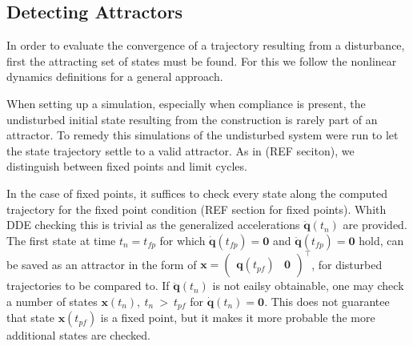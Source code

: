







\subsection{Detecting Attractors}

In order to evaluate the convergence of a trajectory resulting from a disturbance, first the attracting set of states must be found. For this we follow the nonlinear dynamics definitions for a general approach.


When setting up a simulation, especially when compliance is present, the undisturbed initial state resulting from the construction is rarely part of an attractor. To remedy this simulations of the undisturbed system were run to let the state trajectory settle to a valid attractor. As in (REF seciton), we distinguish between fixed points and limit cycles. 

In the case of fixed points, it suffices to check every state along the computed trajectory for the fixed point condition (REF section for fixed points). Whith DDE checking this is trivial as the generalized accelerations $\ddot{\mathbf{q}}(t_n)$ are provided. 
The first state at time $t_n = t_{fp}$ for which $\dot{\mathbf{q}}(t_{fp}) = \mathbf{0}$ and $\ddot{\mathbf{q}}(t_{fp}) = \mathbf{0}$ hold, can be saved as an attractor in the form of $\mathbf{x} = \begin{pmatrix}\mathbf{q}(t_{pf})&\mathbf{0}\end{pmatrix}^\intercal$, for disturbed trajectories to be compared to. 
If $\ddot{\mathbf{q}}(t_n)$ is not eailsy obtainable, one may check a number of states $\mathbf{x}(t_n),\ t_n\ >\ t_{pf}$ for $\dot{\mathbf{q}}(t_n) = \mathbf{0}$. This does not guarantee that state $\mathbf{x}(t_{pf})$ is a fixed point, 
but it makes it more probable the more additional states are checked. 

